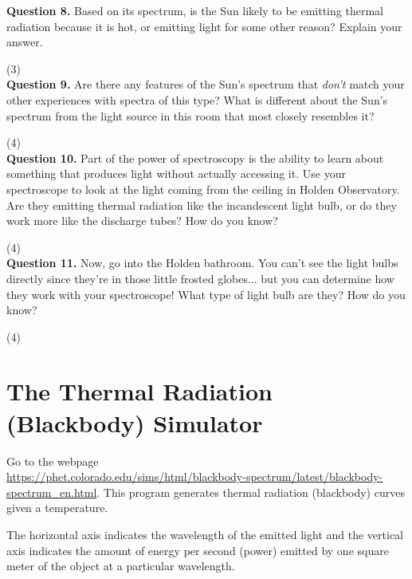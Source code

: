 \documentclass[11pt]{article}
\begin{document}
\textbf{Question 8.} Based on its spectrum, is the Sun likely to be emitting thermal radiation because it is hot, or emitting light for some other reason? Explain your answer.

\vspace{1.5cm}
(3) \hrulefill\\

\textbf{Question 9.} Are there any features of the Sun's spectrum that {\it don't} match your other experiences with spectra of this type? What is different about the Sun's spectrum from the light source in this room that most closely resembles it?

\vspace{2cm}
(4) \hrulefill\\

\textbf{Question 10.} Part of the power of spectroscopy is the ability to learn about something that produces light 
without actually accessing it. Use your spectroscope to look at the light coming from the ceiling in Holden Observatory.
Are they emitting thermal radiation like the incandescent light bulb, or do they work more like the discharge tubes? How do you know?

\vspace{2.5cm}
(4) \hrulefill\\

\textbf{Question 11.} Now, go into the Holden bathroom. You can't see the light bulbs directly since they're in those little frosted globes... but you can determine how they work with your spectroscope! What type of light bulb are they? How do you know?

\vspace{2cm}
(4) \hrulefill\\

\section{The Thermal Radiation (Blackbody) Simulator}

Go to the webpage \\\url {https://phet.colorado.edu/sims/html/blackbody-spectrum/latest/blackbody-spectrum_en.html}. This program generates thermal radiation (blackbody) curves given a temperature.

The horizontal axis indicates the wavelength of the emitted light and the vertical axis indicates the amount of energy per second (power) emitted by one square meter of the object at a particular wavelength.  
\end{document}
